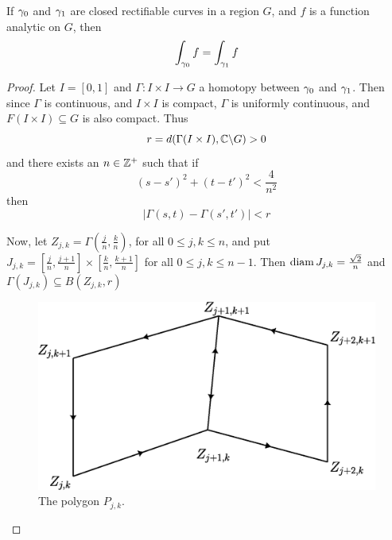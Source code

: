 \begin{theorem}\label{4.6.3}
    If $\gamma_0$ and $\gamma_1$ are closed rectifiable curves in a region $G$, and $f$
    is a function analytic on $G$, then
    \begin{equation*}
    \int_{\gamma_0}{f}=\int_{\gamma_1}{f}
    \end{equation*}
\end{theorem}
\begin{proof}
    Let $I=[0,1]$ and $\Gamma:I \times I \xrightarrow{} G$ a homotopy between
    $\gamma_0$ and $\gamma_1$. Then since $\Gamma$ is continuous, and  $I \times I$ is
    compact,  $\Gamma$ is uniformly continuous, and  $F(I \times I) \subseteq G$
    is also compact. Thus
    \begin{equation*}
        r=d(\Gamma(I \times I), \mathbb{C} \backslash G)>0
    \end{equation*}
    and there exists an $n \in \mathbb{Z}^+$ such that if
    \begin{equation*}
        (s-s')^2+(t-t')^2<\frac{4}{n^2}
    \end{equation*}
    then
    \begin{equation*}
        |\Gamma(s,t)-\Gamma(s',t')|<r
    \end{equation*}

    Now, let $Z_{j,k}=\Gamma(\frac{j}{n},\frac{k}{n})$, for all $0 \leq j,k \leq
    n$, and put  $J_{j,k}=[\frac{j}{n},\frac{j+1}{n}] \times
    [\frac{k}{n},\frac{k+1}{n}]$ for all $0 \leq j,k \leq n-1$. Then
    $\operatorname{diam}{J_{j,k}}=\frac{\sqrt{2}}{n}$  and $\Gamma(J_{j,k}) \subseteq
    B(Z_{j,k},r)$

    \begin{figure}[h]
        \centering
        \includegraphics[scale=0.5]{Figures/Chapter4/cauchy_2.eps}
        \caption{The polygon $P_{j,k}$.}
        \label{figure_4.4}
    \end{figure}


\end{proof}
